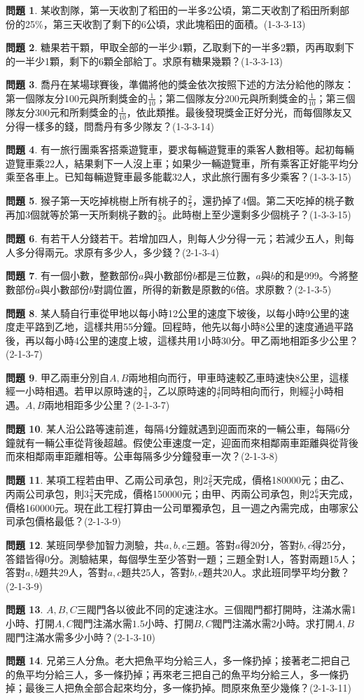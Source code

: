 \documentclass[12pt,a4paper]{article}
\theoremstyle{definition}
\newtheorem{prob}{問題}
\newcommand\prb[1]{\begin{prob}#1\end{prob}}
\begin{document}
\prb{某收割隊，第一天收割了稻田的一半多2公頃，第二天收割了稻田所剩部份的25\%，第三天收割了剩下的6公頃，求此塊稻田的面積。(1-3-3-13)}
\prb{糖果若干顆，甲取全部的一半少4顆，乙取剩下的一半多2顆，丙再取剩下的一半少1顆，剩下的6顆全部給丁。求原有糖果幾顆？(1-3-3-13)}
\prb{喬丹在某場球賽後，準備將他的獎金依次按照下述的方法分給他的隊友：第一個隊友分100元與所剩獎金的$\frac{1}{10}$；第二個隊友分200元與所剩獎金的$\frac{1}{10}$；第三個隊友分300元和所剩獎金的$\frac{1}{10}$，依此類推。最後發現獎金正好分光，而每個隊友又分得一樣多的錢，問喬丹有多少隊友？(1-3-3-14)}
\prb{有一旅行團乘客搭乘遊覽車，要求每輛遊覽車的乘客人數相等。起初每輛遊覽車乘22人，結果剩下一人沒上車；如果少一輛遊覽車，所有乘客正好能平均分乘至各車上。已知每輛遊覽車最多能載32人，求此旅行團有多少乘客？(1-3-3-15)}
\prb{猴子第一天吃掉桃樹上所有桃子的$\frac{2}{5}$，還扔掉了4個。第二天吃掉的桃子數再加3個就等於第一天所剩桃子數的$\frac{5}{8}$。此時樹上至少還剩多少個桃子？(1-3-3-15)}
\prb{有若干人分錢若干。若增加四人，則每人少分得一元；若減少五人，則每人多分得兩元。求原有多少人，多少錢？(2-1-3-4)}
\prb{有一個小數，整數部份$a$與小數部份$b$都是三位數，$a$與$b$的和是999。今將整數部份$a$與小數部份$b$對調位置，所得的新數是原數的6倍。求原數？(2-1-3-5)}
\prb{某人騎自行車從甲地以每小時12公里的速度下坡後，以每小時9公里的速度走平路到乙地，這樣共用55分鐘。回程時，他先以每小時8公里的速度通過平路後，再以每小時4公里的速度上坡，這樣共用1小時30分。甲乙兩地相距多少公里？(2-1-3-7)}
\prb{甲乙兩車分別自$A,B$兩地相向而行，甲車時速較乙車時速快8公里，這樣經一小時相遇。若甲以原時速的$\frac{3}{4}$，乙以原時速的$\frac{4}{7}$同時相向而行，則經$\frac{3}{2}$小時相遇。$A,B$兩地相距多少公里？(2-1-3-7)}
\prb{某人沿公路等速前進，每隔4分鐘就遇到迎面而來的一輛公車，每隔6分鐘就有一輛公車從背後超越。假使公車速度一定，迎面而來相鄰兩車距離與從背後而來相鄰兩車距離相等。公車每隔多少分鐘發車一次？(2-1-3-8)}
\prb{某項工程若由甲、乙兩公司承包，則$2\frac{2}{5}$天完成，價格180000元；由乙、丙兩公司承包，則$3\frac{3}{4}$天完成，價格150000元；由甲、丙兩公司承包，則$2\frac{6}{7}$天完成，價格160000元。現在此工程打算由一公司單獨承包，且一週之內需完成，由哪家公司承包價格最低？(2-1-3-9)}
\prb{某班同學參加智力測驗，共$a,b,c$三題。答對$a$得20分，答對$b,c$得25分，答錯皆得0分。測驗結果，每個學生至少答對一題；三題全對1人，答對兩題15人；答對$a, b$題共29人，答對$a,c$題共25人，答對$b,c$題共20人。求此班同學平均分數？(2-1-3-9)}
\prb{$A,B,C$三閥門各以彼此不同的定速注水。三個閥門都打開時，注滿水需1小時、打開$A,C$閥門注滿水需$1.5$小時、打開$B,C$閥門注滿水需2小時。求打開$A,B$閥門注滿水需多少小時？(2-1-3-10)}
\prb{兄弟三人分魚。老大把魚平均分給三人，多一條扔掉；接著老二把自己的魚平均分給三人，多一條扔掉；再來老三把自己的魚平均分給三人，多一條扔掉；最後三人把魚全部合起來均分，多一條扔掉。問原來魚至少幾條？(2-1-3-11)}
\end{document}
